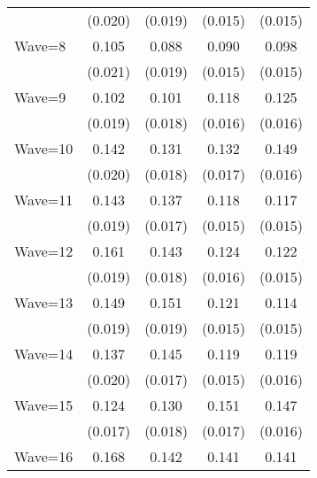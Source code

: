 {\begin{tabular}{l*{4}{c}}
                    &     (0.020)         &     (0.019)         &     (0.015)         &     (0.015)         \\
Wave=8              &       0.105\sym{***}&       0.088\sym{***}&       0.090\sym{***}&       0.098\sym{***}\\
                    &     (0.021)         &     (0.019)         &     (0.015)         &     (0.015)         \\
Wave=9              &       0.102\sym{***}&       0.101\sym{***}&       0.118\sym{***}&       0.125\sym{***}\\
                    &     (0.019)         &     (0.018)         &     (0.016)         &     (0.016)         \\
Wave=10             &       0.142\sym{***}&       0.131\sym{***}&       0.132\sym{***}&       0.149\sym{***}\\
                    &     (0.020)         &     (0.018)         &     (0.017)         &     (0.016)         \\
Wave=11             &       0.143\sym{***}&       0.137\sym{***}&       0.118\sym{***}&       0.117\sym{***}\\
                    &     (0.019)         &     (0.017)         &     (0.015)         &     (0.015)         \\
Wave=12             &       0.161\sym{***}&       0.143\sym{***}&       0.124\sym{***}&       0.122\sym{***}\\
                    &     (0.019)         &     (0.018)         &     (0.016)         &     (0.015)         \\
Wave=13             &       0.149\sym{***}&       0.151\sym{***}&       0.121\sym{***}&       0.114\sym{***}\\
                    &     (0.019)         &     (0.019)         &     (0.015)         &     (0.015)         \\
Wave=14             &       0.137\sym{***}&       0.145\sym{***}&       0.119\sym{***}&       0.119\sym{***}\\
                    &     (0.020)         &     (0.017)         &     (0.015)         &     (0.016)         \\
Wave=15             &       0.124\sym{***}&       0.130\sym{***}&       0.151\sym{***}&       0.147\sym{***}\\
                    &     (0.017)         &     (0.018)         &     (0.017)         &     (0.016)         \\
Wave=16             &       0.168\sym{***}&       0.142\sym{***}&       0.141\sym{***}&       0.141\sym{***}\\

\end{tabular}}
